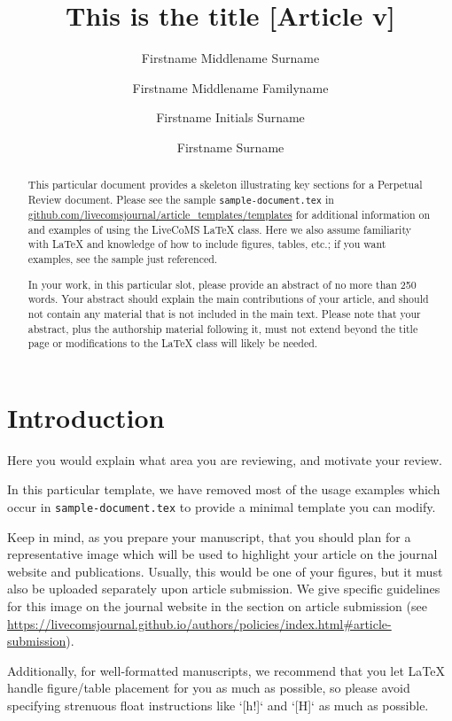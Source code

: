\documentclass[9pt,review]{livecoms}
\title{This is the title [Article v\versionnumber]}
\author[1*]{Firstname Middlename Surname}
\author[1,2\authfn{1}\authfn{3}]{Firstname Middlename Familyname}
\author[2\authfn{1}\authfn{4}]{Firstname Initials Surname}
\author[2*]{Firstname Surname}
\affil[1]{Institution 1}
\affil[2]{Institution 2}
\begin{document}
\begin{frontmatter}
\maketitle

\begin{abstract}
This particular document provides a skeleton illustrating key sections for a Perpetual Review document.
Please see the sample \texttt{sample-document.tex} in \url{github.com/livecomsjournal/article_templates/templates} for additional information on and examples of using the LiveCoMS LaTeX class.
Here we also assume familiarity with LaTeX and knowledge of how to include figures, tables, etc.; if you want examples, see the sample just referenced.

In your work, in this particular slot, please provide an abstract of no more than 250 words.
Your abstract should explain the main contributions of your article, and should not contain any material that is not included in the main text.
Please note that your abstract, plus the authorship material following it, must not extend beyond the title page or modifications to the LaTeX class will likely be needed.
\end{abstract}

\end{frontmatter}




\section{Introduction}

Here you would explain what area you are reviewing, and motivate your review.

In this particular template, we have removed most of the usage examples which occur in \texttt{sample-document.tex} to provide a minimal template you can modify.

Keep in mind, as you prepare your manuscript, that you should plan for a representative image  which will be used to highlight your article on the journal website and publications. Usually, this would be one of your figures, but it must also be uploaded separately upon article submission. We give specific guidelines for this image on the journal website in the section on article submission (see \url{https://livecomsjournal.github.io/authors/policies/index.html#article-submission}).

Additionally, for well-formatted manuscripts, we recommend that you let LaTeX handle figure/table placement for you as much as possible, so please avoid specifying strenuous float instructions like `[h!]` and `[H]` as much as possible.
\end{document}
